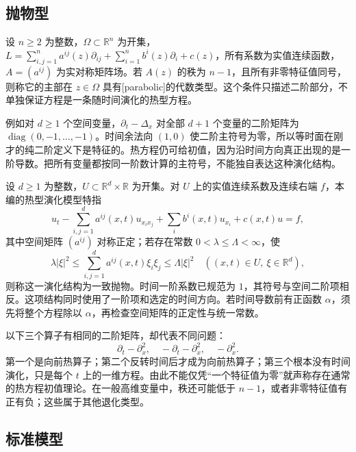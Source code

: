 \subsection{抛物型}
\label{b2:subsec:080203}

\begin{definition}\label{b2:def:08-parabolic-algebraic}
设 \(n\geq2\) 为整数，\(\Omega\subset\mathbb R^n\) 为开集，\(L=\sum_{i,j=1}^n a^{ij}(z)\partial_{ij}+\sum_{i=1}^n b^i(z)\partial_i+c(z)\)，所有系数为实值连续函数，\(A=(a^{ij})\) 为实对称矩阵场。若 \(A(z)\) 的秩为 \(n-1\)，且所有非零特征值同号，则称它的主部在 \(z\in\Omega\) 具有[parabolic]的代数类型。这个条件只描述二阶部分，不单独保证方程是一条随时间演化的热型方程。
\end{definition}

例如对 \(d\geq1\) 个空间变量，\(\partial_t-\Delta_x\) 对全部 \(d+1\) 个变量的二阶矩阵为 \(\operatorname{diag}(0,-1,\ldots,-1)\)。时间余法向 \((1,0)\) 使二阶主符号为零，所以等时面在刚才的纯二阶定义下是特征的。热方程仍可给初值，因为沿时间方向真正出现的是一阶导数。把所有变量都按同一阶数计算的主符号，不能独自表达这种演化结构。

\ProseParagraphBreak

设 \(d\geq1\) 为整数，\(U\subset\mathbb R^d\times\mathbb R\) 为开集。对 \(U\) 上的实值连续系数及连续右端 \(f\)，本编的热型演化模型特指
\begin{equation}\label{b2:eq:08-parabolic-evolution}
 u_t-\sum_{i,j=1}^d a^{ij}(x,t)u_{x_ix_j}
 +\sum_i b^i(x,t)u_{x_i}+c(x,t)u=f,
\end{equation}
其中空间矩阵 \((a^{ij})\) 对称正定；若存在常数 \(0<\lambda\leq\Lambda<\infty\)，使
\[
 \lambda|\xi|^2\leq\sum_{i,j=1}^d a^{ij}(x,t)\xi_i\xi_j
 \leq\Lambda|\xi|^2
 \quad((x,t)\in U,\ \xi\in\mathbb R^d),
\]
则称这一演化结构为一致抛物。时间一阶系数已规范为 \(1\)，其符号与空间二阶项相反。这项结构同时使用了一阶项和选定的时间方向。若时间导数前有正函数 \(\alpha\)，须先将整个方程除以 \(\alpha\)，再检查空间矩阵的正定性与统一常数。

\ProseParagraphBreak

以下三个算子有相同的二阶矩阵，却代表不同问题：
\[
 \partial_t-\partial_x^2,\quad
 -\partial_t-\partial_x^2,\quad
 -\partial_x^2.
\]
第一个是向前热算子；第二个反转时间后才成为向前热算子；第三个根本没有时间演化，只是每个 \(t\) 上的一维方程。由此不能仅凭“一个特征值为零”就声称存在通常的热方程初值理论。在一般高维变量中，秩还可能低于 \(n-1\)，或者非零特征值有正有负；这些属于其他退化类型。

\subsection{标准模型}
\label{b2:subsec:080204}

